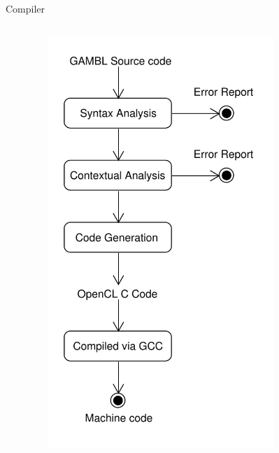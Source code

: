 \begin{frame}[t]{Compiler}
\begin{columns}[t]
\begin{column}{.48\textwidth}
            \end{column}
            \begin{column}{.48\textwidth}
                \vspace{-30pt}
                \begin{figure}
                    \centering
                    \includegraphics[width=0.8\textwidth]{images/CompilerDiagram.pdf}
                \end{figure}
            \end{column}
        \end{columns}
    \end{frame}